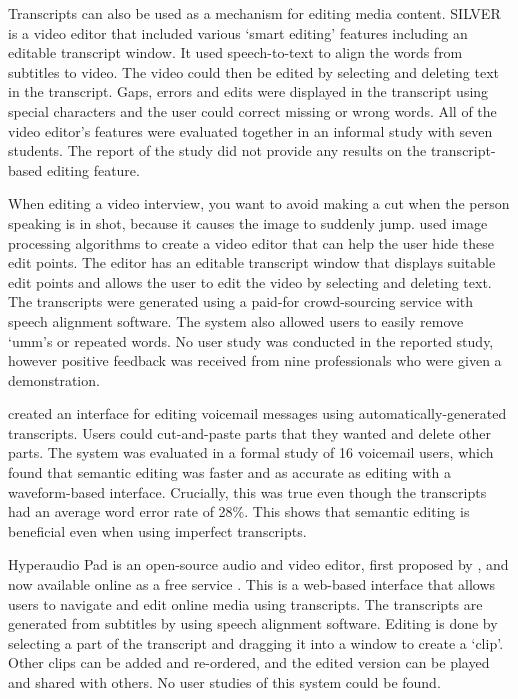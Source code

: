 Transcripts can also be used as a mechanism for editing media content.  \mbox{SILVER} \citep{Casares2002, Long2003} is
a video editor that included various `smart editing' features including an editable transcript window. It used
speech-to-text to align the words from subtitles to video. The video could then be edited by selecting and deleting
text in the transcript. Gaps, errors and edits were displayed in the transcript using special characters and the user
could correct missing or wrong words. All of the video editor's features were evaluated together in an informal study
with seven students. The report of the study did not provide any results on the transcript-based editing feature.

When editing a video interview, you want to avoid making a cut when the person speaking is in shot, because it causes
the image to suddenly jump.  \citet{Berthouzoz2012} used image processing algorithms to create a video editor that can
help the user hide these edit points. The editor has an editable transcript window that displays suitable edit points
and allows the user to edit the video by selecting and deleting text. The transcripts were generated using a paid-for
crowd-sourcing service with speech alignment software. The system also allowed users to easily remove `umm's or
repeated words. No user study was conducted in the reported study, however positive feedback was received from nine
professionals who were given a demonstration.

\citet{Whittaker2004} created an interface for editing voicemail messages using automatically-generated transcripts.
Users could cut-and-paste parts that they wanted and delete other parts.  The system was evaluated in a formal study of
16 voicemail users, which found that semantic editing was faster and as accurate as editing with a waveform-based
interface. Crucially, this was true even though the transcripts had an average word error rate of 28\%. This shows that
semantic editing is beneficial even when using imperfect transcripts.

Hyperaudio Pad is an open-source audio and video editor, first proposed by \citet{Boas2011}, and now available online
as a free service \citep{Hyperaudio2016}. This is a web-based interface that allows users to navigate and edit online
media using transcripts. The transcripts are generated from subtitles by using speech alignment software. Editing is
done by selecting a part of the transcript and dragging it into a window to create a `clip'.  Other clips can be added
and re-ordered, and the edited version can be played and shared with others. No user studies of this system could be
found.

